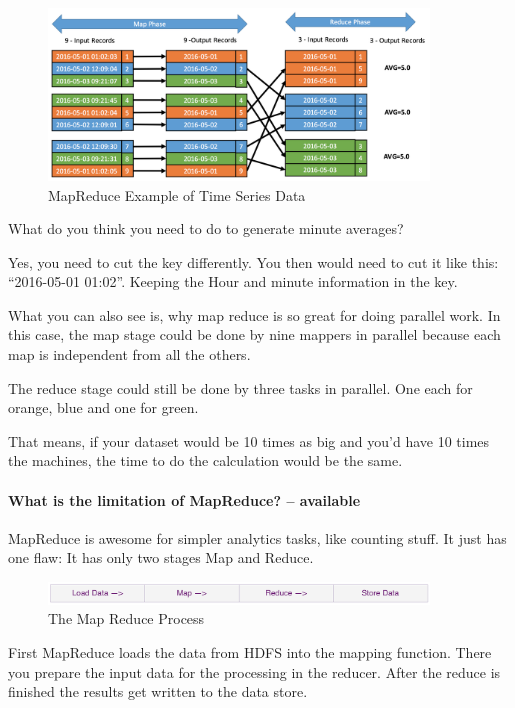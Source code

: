 \documentclass[12pt]{scrartcl} %
\begin{document}
\begin{figure}[htbp] 
  \centering
     \includegraphics[width=0.9\textwidth]{images/MapReduce-Time-Series-example}
  \caption{MapReduce Example of Time Series Data}
  \label{fig:Bild1}
\end{figure}

What do you think you need to do to generate minute averages?

Yes, you need to cut the key differently. You then would need to cut it like this: “2016-05-01 01:02”. Keeping the Hour and minute information in the key.

What you can also see is, why map reduce is so great for doing parallel work. In this case, the map stage could be done by nine mappers in parallel because each map is independent from all the others.

The reduce stage could still be done by three tasks in parallel. One each for orange, blue and one for green.

That means, if your dataset would be 10 times as big and you’d have 10 times the machines, the time to do the calculation would be the same.

\paragraph{What is the limitation of MapReduce? -- available}
MapReduce is awesome for simpler analytics tasks, like counting stuff. It just has one flaw: It has only two stages Map and Reduce.

\begin{figure}[htbp] 
  \centering
     \includegraphics[width=0.9\textwidth]{images/MapReduce-Process}
  \caption{The Map Reduce Process}
  \label{fig:Bild1}
\end{figure}

First MapReduce loads the data from HDFS into the mapping function. There you prepare the input data for the processing in the reducer. After the reduce is finished the results get written to the data store.
\end{document}
